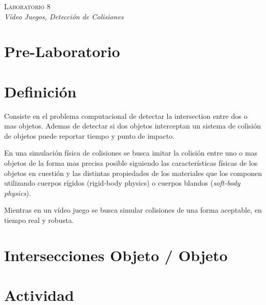 \begin{center}
\textsc{\Large Laboratorio 8}~\\
\emph{\large Vídeo Juegos, Detección de Colisiones}
\end{center}

\section{Pre-Laboratorio}

\section{Definición}
Consiste en el problema computacional de detectar la intersection entre dos o mas objetos. Ademas de detectar si dos objetos interceptan un sistema de colisión de objetos puede reportar tiempo y punto de impacto.

En una simulación física de colisiones se busca imitar la colisión entre uno o mas objetos de la forma mas precisa posible siguiendo las características físicas de los objetos en cuestión y las distintas propiedades de los materiales que los componen utilizando cuerpos rígidos (rigid-body physics) o cuerpos blandos (\emph{soft-body physics}).

Mientras en un vídeo juego se busca simular colisiones de una forma aceptable, en tiempo real y robusta.

\section{Intersecciones Objeto / Objeto}

\section{Actividad}
